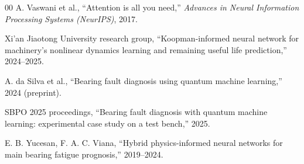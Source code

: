 \documentclass[3p,times,procedia]{elsarticle}
\begin{document}
\begin{thebibliography}{00}
A. Vaswani et al., ``Attention is all you need,'' \textit{Advances in Neural Information Processing Systems (NeurIPS)}, 2017.

Xi'an Jiaotong University research group, ``Koopman-informed neural network for machinery's nonlinear dynamics learning and remaining useful life prediction,'' 2024--2025.

A. da Silva et al., ``Bearing fault diagnosis using quantum machine learning,'' 2024 (preprint).

SBPO 2025 proceedings, ``Bearing fault diagnosis with quantum machine learning: experimental case study on a test bench,'' 2025.

E. B. Yucesan, F. A. C. Viana, ``Hybrid physics-informed neural networks for main bearing fatigue prognosis,'' 2019--2024.

\end{thebibliography}
\end{document}
